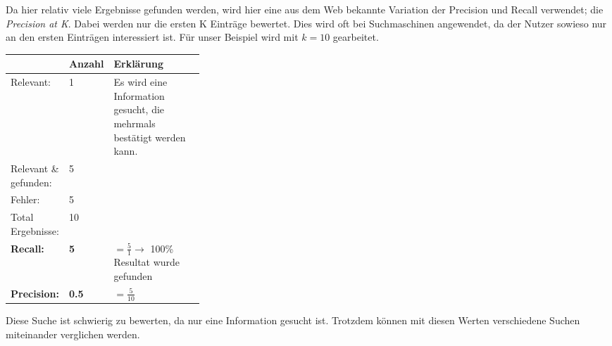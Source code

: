 Da hier relativ viele Ergebnisse gefunden werden, wird hier eine aus dem Web bekannte Variation der Precision und Recall verwendet; die \textit{Precision at K}. Dabei werden nur die ersten K Einträge bewertet. Dies wird oft bei Suchmaschinen angewendet, da der Nutzer sowieso nur an den ersten Einträgen interessiert ist.
Für unser Beispiel wird mit $k = 10$ gearbeitet.

\begin{table}[H]
	\centering
	\small\renewcommand{\arraystretch}{1.4}
	\label{tab:index_abendmahl}
	\begin{tabularx}{0.9\textwidth}{ L{0.22\linewidth} | L{0.1\linewidth} | X }%
		\hline
		& Anzahl & Erklärung \\ \hline \hline
		Relevant: & 1 & Es wird eine Information gesucht, die mehrmals bestätigt werden kann.\\
		Relevant \& gefunden: & 5 & \\
		Fehler: & 5 & \\
		Total Ergebnisse: & 10 & \\
		\hline
		\textbf{Recall:} & \textbf{5} & $= \frac{5}{1} \rightarrow$ 100\% Resultat wurde gefunden\\
		\textbf{Precision:} & \textbf{0.5} & $= \frac{5}{10}$ \\
		\hline\hline
	\end{tabularx}
\end{table}

Diese Suche ist schwierig zu bewerten, da nur eine Information gesucht ist. Trotzdem können mit diesen Werten verschiedene Suchen miteinander verglichen werden.


\newpage
